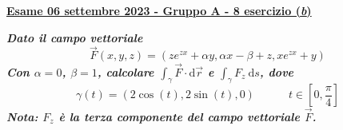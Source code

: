 \documentclass[a4paper]{article}
\newcommand{\definition}[1]{\textcolor{Red3}{\textbf{#1}}}
\newcommand{\example}[1]{\textcolor{Green4}{\textbf{#1}}}
\begin{document}
	\begin{flushleft}
		\label{exam: esame 06 settembre 2023 - Gruppo A - 8 esercizio (b)}
		\hypertarget{
			exam: esame 06 settembre 2023 - Gruppo A - 8 esercizio (b)
		}{
			\definition{\underline{Esame 06 settembre 2023 - Gruppo A - 8 esercizio (\emph{b})}}
		}
	\end{flushleft}
	\example{\emph{Dato il campo vettoriale}
	\begin{equation*}
		\overset{\rightarrow}{F}\left(x,y,z\right) = \left(ze^{zx}+\alpha y, \alpha x - \beta + z, xe^{zx}+y\right)
	\end{equation*}
	\emph{Con $\alpha = 0$, $\beta = 1$, calcolare $\int_{\gamma} \overset{\rightarrow}{F} \cdot \mathrm{d}\overrightarrow{r}$ e $\int_{\gamma} F_{z} \:\mathrm{d}s$, dove}
	\begin{equation*}
		\gamma\left(t\right) = \left(2\cos\left(t\right), 2\sin\left(t\right), 0\right) \hspace{3em} t \in \left[0, \frac{\pi}{4}\right]
	\end{equation*}}
	\example{\emph{Nota: $F_{z}$ è la terza componente del campo vettoriale $\overset{\rightarrow}{F}$.}}\newline
	
\end{document}
